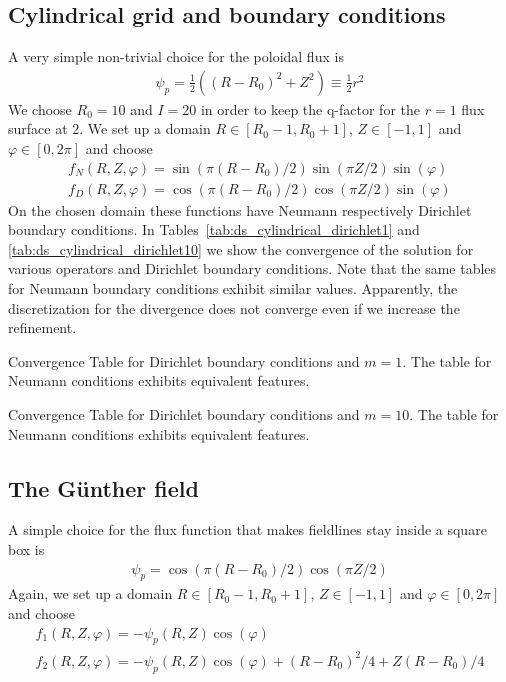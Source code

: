 \subsection{Cylindrical grid and boundary conditions}
A very simple non-trivial choice for the poloidal flux is
\begin{align}
  \psi_p = \frac{1}{2} \left( (R-R_0)^2 + Z^2 \right) \equiv \frac{1}{2} r^2
  \label{eq:circular}
\end{align}
We choose $R_0 = 10$ and $I=20$ in order to keep the q-factor for the $r=1$ flux surface at $2$.
We set up a domain
$R\in[R_0-1, R_0+1]$,
$Z\in[-1,1]$ and
$\varphi \in [0,2\pi]$ and choose
\begin{align}
  f_N(R,Z,\varphi) = \sin(\pi (R-R_0)/2) \sin(\pi Z /2)\sin(\varphi)\\
  f_D(R,Z,\varphi) = \cos(\pi (R-R_0)/2) \cos(\pi Z /2)\sin(\varphi)
  \label{}
\end{align}
On the chosen domain these functions have Neumann respectively Dirichlet boundary conditions.
In Tables~\ref{tab:ds_cylindrical_dirichlet1} and
\ref{tab:ds_cylindrical_dirichlet10} we show the convergence of the solution
for various operators and Dirichlet boundary conditions. Note that the same
tables for Neumann boundary conditions exhibit similar values.
Apparently, the discretization for the divergence does not converge even if we
increase the refinement.
\begin{table*}[ht]
\begin{centering}
\footnotesize
\hspace*{-2cm}

\caption{Convergence Table for Dirichlet boundary conditions and $m=1$. The
table for Neumann conditions exhibits equivalent features.}
\label{tab:ds_cylindrical_dirichlet1}
\end{centering}
\end{table*}

\begin{table*}[ht]
\begin{centering}
\footnotesize
\hspace*{-2cm}

\caption{Convergence Table for Dirichlet boundary conditions and $m=10$. The
table for Neumann conditions exhibits equivalent features.}
\label{tab:ds_cylindrical_dirichlet10}
\end{centering}
\end{table*}

\subsection{The G\"unther field}
A simple choice for the flux function that makes fieldlines stay
inside a square box is
\begin{align}
  \psi_p = \cos(\pi (R-R_0)/2) \cos(\pi Z /2)
\label{}
\end{align}
Again, we set up a domain
$R\in[R_0-1, R_0+1]$,
$Z\in[-1,1]$ and
$\varphi \in [0,2\pi]$ and choose
\begin{align}
  f_1(R,Z,\varphi) = -\psi_p(R,Z)\cos(\varphi)\\
  f_2(R,Z,\varphi) = -\psi_p(R,Z)\cos(\varphi) + (R-R_0)^2/4 + Z(R-R_0)/4
  \label{}
\end{align}
